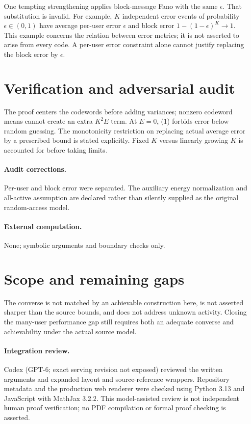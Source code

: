 \documentclass[11pt]{article}
\begin{document}
One tempting strengthening applies block-message Fano with the same $\epsilon$. That substitution is invalid. For example, $K$ independent error events of probability $\epsilon\in(0,1)$ have average per-user error $\epsilon$ and block error $1-(1-\epsilon)^K\to1$. This example concerns the relation between error metrics; it is not asserted to arise from every code. A per-user error constraint alone cannot justify replacing the block error by $\epsilon$.
\section{Verification and adversarial audit}
The proof centers the codewords before adding variances; nonzero codeword means cannot create an extra $K^2E$ term. At $E=0$, (1) forbids error below random guessing. The monotonicity restriction on replacing actual average error by a prescribed bound is stated explicitly. Fixed $K$ versus linearly growing $K$ is accounted for before taking limits.
\paragraph{Audit corrections.} Per-user and block error were separated. The auxiliary energy normalization and all-active assumption are declared rather than silently supplied as the original random-access model.
\paragraph{External computation.} None; symbolic arguments and boundary checks only.
\section{Scope and remaining gaps}
The converse is not matched by an achievable construction here, is not asserted sharper than the source bounds, and does not address unknown activity. Closing the many-user performance gap still requires both an adequate converse and achievability under the actual source model.
\paragraph{Integration review.} Codex (GPT-6; exact serving revision not exposed) reviewed the written arguments and expanded layout and source-reference wrappers. Repository metadata and the production web renderer were checked using Python 3.13 and JavaScript with MathJax 3.2.2. This model-assisted review is not independent human proof verification; no PDF compilation or formal proof checking is asserted.
\end{document}
